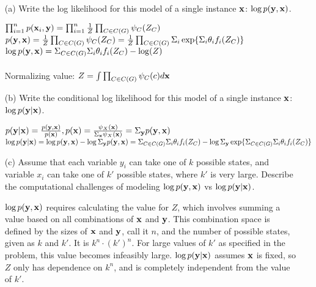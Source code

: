 \documentclass[11pt]{article}
\newcommand{\vx}{{\bf x}}
\newcommand{\vy}{{\bf y}}
\begin{document}
\begin{enumerate}
\item[(a)] Write the log likelihood for this model of a single instance $\vx$: $\log{p(\vy,\vx)}$. 

\begin{answertext}{4cm}{}

$\prod_{i=1}^n p(\vx_i, \vy) = \prod_{i=1}^n \frac{1}{Z} \prod_{C \in C(G) } \psi_C(Z_C)$\\
$p(\vy, \vx) = \frac{1}{Z} \prod_{C \in C(G)} \psi_C(Z_C) = \frac{1}{Z} \prod_{C \in C(G)} \Sigma_i \exp\{\Sigma_i \theta_i f_i(Z_C)\}$\\
$\log p(\vy, \vx) = \Sigma_{C \in C(G)}\Sigma_i \theta_i f_i(Z_C) - \log(Z)$\\\\

Normalizing value: $Z = \int \prod_{C \in C(G)} \psi_C(c) d\vx$

\end{answertext} 

\item[(b)] Write the conditional log likelihood for this model of a single instance $\vx$: $\log{p(\vy|\vx)}$. 

\begin{answertext}{2.5cm}{}

$p(\vy | \vx) = \frac{p(\vy, \vx)}{p(\vx)}, p(\vx) = \frac{\psi_X(\vx)}{\Sigma_\vx \psi_X(\vx)} = \Sigma_\vy p(\vy, \vx)$\\
$\log p(\vy | \vx) = \log p(\vy, \vx) - \log \Sigma_\vy p(\vy, \vx)\\ = \Sigma_{C \in C(G)}\Sigma_i \theta_i f_i(Z_C) - \log \Sigma_\vy \exp\{\Sigma_{C \in C(G)}\Sigma_i \theta_i f_i(Z_C)\}$

\end{answertext} 
\item[(c)] Assume that each variable $y_i$ can take one of $k$ possible states, and variable $x_i$ can take one of $k'$ possible states, where $k'$ is very large. Describe the computational challenges of modeling $\log p(\vy,\vx)$ vs $\log p(\vy|\vx)$.

\begin{answertext}{3.5cm}{}

$\log p(\vy, \vx)$ requires calculating the value for $Z$, which involves summing a value based on all combinations of $\vx$ and $\vy$. This combination space is defined by the sizes of $\vx$ and $\vy$, call it $n$, and the number of possible states, given as $k$ and $k'$. It is $k^n \cdot (k')^n$. For large values of $k'$ as specified in the problem, this value becomes infeasibly large. $\log p(\vy | \vx)$ assumes $\vx$ is fixed, so $Z$ only has dependence on $k^n$, and is completely independent from the value of $k'$.

\end{answertext} 
\end{enumerate}
\end{document}
